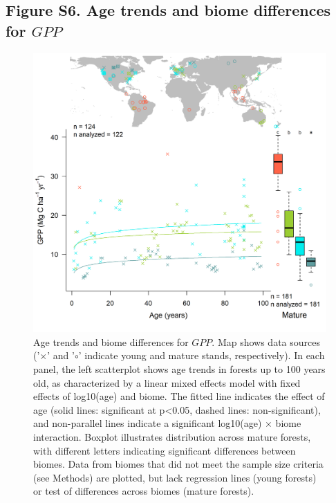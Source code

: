 \documentclass[
]{article}
\begin{document}
\newpage

\hypertarget{figure-s6.-age-trends-and-biome-differences-for-gpp}{%
\subsection{\texorpdfstring{Figure S6. Age trends and biome differences
for
\(GPP\)}{Figure S6. Age trends and biome differences for GPP}}\label{figure-s6.-age-trends-and-biome-differences-for-gpp}}

\begin{figure}[H]

{\centering \includegraphics[width=1\linewidth]{tables_figures/age_trends/GPP_with_map} 

}

\caption{Age trends and biome differences for $GPP$. Map shows data sources ('$\times$' and '$\circ$' indicate young and mature stands, respectively). In each panel, the left scatterplot shows age trends in forests up to 100 years old, as characterized by a linear mixed effects model with fixed effects of log10(age) and biome. The fitted line indicates the effect of age (solid lines: significant at p<0.05, dashed lines: non-significant), and non-parallel lines indicate a significant log10(age) $\times$ biome interaction. Boxplot illustrates distribution across mature forests, with different letters indicating significant differences between biomes. Data from biomes that did not meet the sample size criteria (see Methods) are plotted, but lack regression lines (young forests) or test of differences across biomes (mature forests).}\label{fig:unnamed-chunk-9}
\end{figure}
\end{document}

